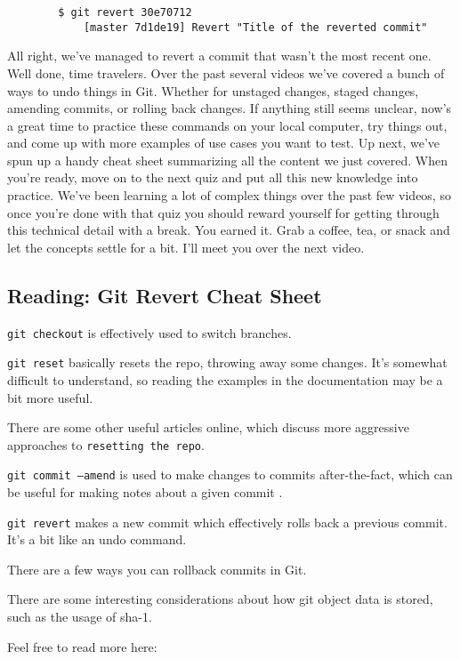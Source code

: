 	\begin{verbatim}
		$ git revert 30e70712
			[master 7d1de19] Revert "Title of the reverted commit"	
	\end{verbatim}

	All right, we've managed to revert a commit that wasn't the most recent one. Well done, time travelers. Over the past several videos we've covered a bunch of ways to undo things in Git. Whether for unstaged changes, staged changes, amending commits, or rolling back changes. If anything still seems unclear, now's a great time to practice these commands on your local computer, try things out, and come up with more examples of use cases you want to test. Up next, we've spun up a handy cheat sheet summarizing all the content we just covered. When you're ready, move on to the next quiz and put all this new knowledge into practice. We've been learning a lot of complex things over the past few videos, so once you're done with that quiz you should reward yourself for getting through this technical detail with a break. You earned it. Grab a coffee, tea, or snack and let the concepts settle for a bit. I'll meet you over the next video.
	
	\subsection{Reading: Git Revert Cheat Sheet}
	
	
	\texttt{git checkout} is effectively used to switch branches.
	
	\texttt{git reset} basically resets the repo, throwing away some changes. It’s somewhat difficult to understand, so reading the examples in the documentation may be a bit more useful. 
	
	There are some other useful articles online, which discuss more aggressive approaches to \texttt{resetting the repo}.
	
	\texttt{git commit --amend} is used to make changes to commits after-the-fact, which can be useful for making notes about a given commit .
	
	\texttt{git revert} makes a new commit which effectively rolls back a previous commit. It’s a bit like an undo command.
	
	There are a few ways you can rollback commits in Git. 
	
	There are some interesting considerations about how git object data is stored, such as the usage of sha-1. 
	
	Feel free to read more here:
	
